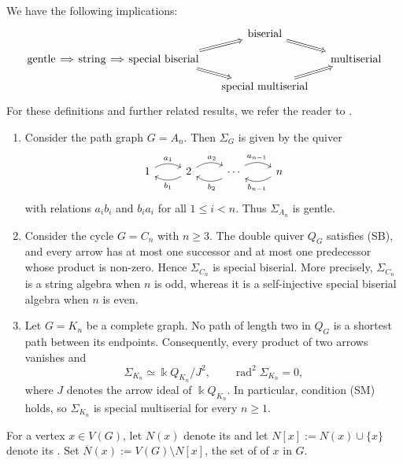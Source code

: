 \documentclass[a4paper,leqno]{amsart}
\begin{document}
We have the following implications:
$$\begin{tikzcd}[column sep=small,row sep=small]
&&& \text{biserial} \arrow[dr, Rightarrow] & \\
\text{gentle} \arrow[r, Rightarrow]
& \text{string} \arrow[r, Rightarrow]
& \text{special biserial}
  \arrow[ur, Rightarrow]
  \arrow[dr, Rightarrow]
&& \text{multiserial} \\
&&& \text{special multiserial} \arrow[ur, Rightarrow] &
\end{tikzcd}$$
For these definitions and further related results, we refer the reader to \cite{Fuller68,SW83,GS16}.

\begin{eg}\label{eg:line and cycle}
\begin{enumerate}
\item Consider the path graph $G=A_n$. Then $\Sigma_G$ is given by the quiver
$$
\begin{tikzcd}
	1 & 2 & \cdots & n
	\arrow["{a_1}", bend left, from=1-1, to=1-2]
	\arrow["{b_1}", bend left, from=1-2, to=1-1]
	\arrow["{a_2}"{pos=0.6}, bend left, from=1-2, to=1-3]
	\arrow["{b_2}"{pos=0.4}, bend left, from=1-3, to=1-2]
	\arrow["{a_{n-1}}"{pos=0.45}, bend left, from=1-3, to=1-4]
	\arrow["{b_{n-1}}"{pos=0.55}, bend left, from=1-4, to=1-3]
\end{tikzcd}
$$
with relations $a_ib_i$ and $b_ia_i$ for all $1\leq i<n$. Thus $\Sigma_{A_n}$ is gentle.

\item Consider the cycle $G=C_n$ with $n\geq3$. The double quiver
$Q_G$ satisfies (SB), and every arrow has at most one successor and at
most one predecessor whose product is non-zero. Hence $\Sigma_{C_n}$ is
special biserial. More precisely, $\Sigma_{C_n}$ is a string algebra
when $n$ is odd, whereas it is a self-injective special biserial algebra when $n$ is even.

\item Let $G=K_n$ be a complete graph. No path of length two in $Q_G$ is a shortest path between its endpoints. Consequently, every product of two arrows vanishes and
$$\Sigma_{K_n}\simeq\Bbbk Q_{K_n}/J^2,
\qquad\operatorname{rad}^2\Sigma_{K_n}=0,$$
where $J$ denotes the arrow ideal of $\Bbbk Q_{K_n}$. In particular, condition (SM) holds, so $\Sigma_{K_n}$ is special multiserial for every $n\geq1$.
\end{enumerate}
\end{eg}

For a vertex $x\in V(G)$, let $N(x)$ denote its  and let $N[x]:=N(x)\cup\{x\}$ denote its . Set $\overline N(x):=V(G)\setminus N[x]$, the set of  of $x$ in $G$.
\end{document}
